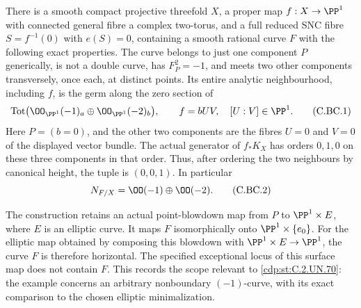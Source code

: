 
\begin{proposition}\label{cdp:st:C.2.UN.79}
There is a smooth compact projective threefold \(X\), a proper map
\(f:X\to\PP^1\) with connected general fibre a complex two-torus,
and a full reduced SNC fibre \(S=f^{-1}(0)\) with \(e(S)=0\),
containing a smooth rational curve \(F\) with the following exact
properties. The curve belongs to just one component \(P\) generically,
is not a double curve, has \(F_P^2=-1\), and meets two other
components transversely, once each, at distinct points. Its entire
analytic neighbourhood, including \(f\), is the germ along the zero
section of
\[
 \operatorname{Tot}\bigl(\OO_{\PP^1}(-1)_a
                 \oplus\OO_{\PP^1}(-2)_b\bigr),\qquad
 f=bUV,\quad [U:V]\in\PP^1.                         \tag{C.BC.1}\label{cdp:eq:C.BC.1}
\]
Here \(P=(b=0)\), and the other two components are the fibres
\(U=0\) and \(V=0\) of the displayed vector bundle.
The actual generator of \(f_*K_X\) has orders \(0,1,0\)
on these three components in that order. Thus, after ordering the
two neighbours by canonical height, the tuple is \((0,0,1)\).
In particular
\[
                    N_{F/X}=\OO(-1)\oplus\OO(-2).            \tag{C.BC.2}\label{cdp:eq:C.BC.2}
\]

The construction retains an actual point-blowdown map from \(P\)
to \(\PP^1\times E\), where \(E\) is an elliptic curve.
It maps \(F\) isomorphically onto \(\PP^1\times\{e_0\}\).
For the elliptic map obtained by composing this blowdown with
\(\PP^1\times E\to\PP^1\), the curve \(F\) is therefore
horizontal. The specified exceptional locus of this surface map
does not contain \(F\). This records the scope relevant to \ref{cdp:st:C.2.UN.70}:
the example concerns an arbitrary nonboundary \((-1)\)-curve,
with its exact comparison to the chosen elliptic minimalization.
\end{proposition}

